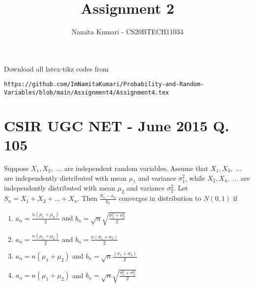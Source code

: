 \documentclass[journal,12pt,twocolumn]{IEEEtran}
\begin{document}
\makeatletter
{}
\makeatother
\let\StandardTheFigure\thefigure
\let\vec\mathbf
\renewcommand{\thefigure}{\theproblem}
\def\putbox#1#2#3{\makebox[0in][l]{\makebox[#1][l]{}\raisebox{\baselineskip}[0in][0in]{\raisebox{#2}[0in][0in]{#3}}}}
     \def\rightbox#1{\makebox[0in][r]{#1}}
     \def\centbox#1{\makebox[0in]{#1}}
     \def\topbox#1{\raisebox{-\baselineskip}[0in][0in]{#1}}
     \def\midbox#1{\raisebox{-0.5\baselineskip}[0in][0in]{#1}}
\vspace{3cm}
\title{Assignment 2}
\author{Namita Kumari - CS20BTECH11034}
\maketitle
\newpage
\bigskip
Download all latex-tikz codes from 
%
\begin{lstlisting}
https://github.com/ImNamitaKumari/Probability-and-Random-Variables/blob/main/Assignment4/Assignment4.tex
\end{lstlisting}
\section{CSIR UGC NET - June 2015 Q. 105}
Suppose $X_1, X_2,$ ... are independent random variables. Assume that $X_1,X_3,$ ... are independently distributed with mean $\mu_1$ and variance $\sigma_1^2$, while $X_2,X_4,$ ... are independently distributed with mean $\mu_2$ and variance $\sigma_2^2$. Let $S_n=X_1+X_2+...+X_n$. Then $\frac{S_n-a_n}{b_n}$ converges in distribution to $N(0,1)$ if
\begin{enumerate}
    \item $a_n=\frac{n(\mu_1+\mu_2)}{2}$ and $b_n=\sqrt{n}\sqrt{\frac{\sigma_1^2+\sigma_2^2}{2}}$
    \item $a_n=\frac{n(\mu_1+\mu_2)}{2}$ and $b_n=\frac{n(\sigma_1+\sigma_2)}{2}$
    \item $a_n=n(\mu_1+\mu_2)$ and $b_n=\sqrt{n}\frac{(\sigma_1+\sigma_2)}{2}$
    \item $a_n=n(\mu_1+\mu_2)$ and $b_n=\sqrt{n}\sqrt{\frac{\sigma_1^2+\sigma_2^2}{2}}$
\end{enumerate}
\end{document}
